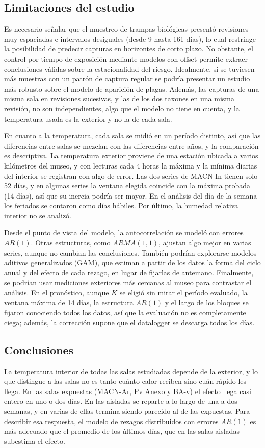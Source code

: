 \documentclass[11pt,a4paper]{article}
\begin{document}
\subsection{Limitaciones del estudio}
Es necesario señalar que el muestreo de trampas biológicas presentó revisiones muy espaciadas e intervalos desiguales (desde 9 hasta 161 días), lo cual restringe la posibilidad de predecir capturas en horizontes de corto plazo. No obstante, el control por tiempo de exposición mediante modelos con offset permite extraer conclusiones válidas sobre la estacionalidad del riesgo. Idealmente, si se tuviesen más muestras con un patrón de captura regular se podría presentar un estudio más robusto sobre el modelo de aparición de plagas. 
Además, las capturas de una misma sala en revisiones sucesivas, y las de los dos taxones en una misma revisión, no son independientes, algo que el modelo no tiene en cuenta, y la temperatura usada es la exterior y no la de cada sala.

En cuanto a la temperatura, cada sala se midió en un período distinto, así que las diferencias entre salas se mezclan con las diferencias entre años, y la comparación es descriptiva. La temperatura exterior proviene de una estación ubicada a varios kilómetros del museo, y con lecturas cada 4 horas la máxima y la mínima diarias del interior se registran con algo de error. Las dos series de MACN-In tienen solo 52 días, y en algunas series la ventana elegida coincide con la máxima probada (14 días), así que su inercia podría ser mayor. En el análisis del día de la semana los feriados se contaron como días hábiles. Por último, la humedad relativa interior no se analizó.

Desde el punto de vista del modelo, la autocorrelación se modeló con errores $AR(1)$. Otras estructuras, como $ARMA(1,1)$, ajustan algo mejor en varias series, aunque no cambian las conclusiones. También podrían explorarse modelos aditivos generalizados (GAM), que estiman a partir de los datos la forma del ciclo anual y del efecto de cada rezago, en lugar de fijarlas de antemano. Finalmente, se podrían usar mediciones exteriores más cercanas al museo para contrastar el análisis. En el pronóstico, aunque $K$ se eligió sin mirar el período evaluado, la ventana máxima de 14 días, la estructura $AR(1)$ y el largo de los bloques se fijaron conociendo todos los datos, así que la evaluación no es completamente ciega; además, la corrección supone que el datalogger se descarga todos los días.

\subsection{Conclusiones}
La temperatura interior de todas las salas estudiadas depende de la exterior, y lo que distingue a las salas no es tanto cuánto calor reciben sino cuán rápido les llega. En las salas expuestas (MACN-Ar, Pv Anexo y BA-v) el efecto llega casi entero en uno o dos días. En las aisladas se reparte a lo largo de una a dos semanas, y en varias de ellas termina siendo parecido al de las expuestas. Para describir esa respuesta, el modelo de rezagos distribuidos con errores $AR(1)$ es más adecuado que el promedio de los últimos días, que en las salas aisladas subestima el efecto.
\end{document}
